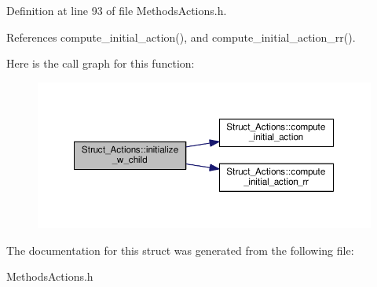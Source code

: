 Definition at line 93 of file Methods\-Actions.\-h.



References compute\-\_\-initial\-\_\-action(), and compute\-\_\-initial\-\_\-action\-\_\-rr().



Here is the call graph for this function\-:\nopagebreak
\begin{figure}[H]
\begin{center}
\leavevmode
\includegraphics[width=350pt]{structStruct__Actions_a65aec6da3f4aa08047e285566fe45487_cgraph}
\end{center}
\end{figure}




The documentation for this struct was generated from the following file\-:\begin{DoxyCompactItemize}
\item 
Methods\-Actions.\-h\end{DoxyCompactItemize}
